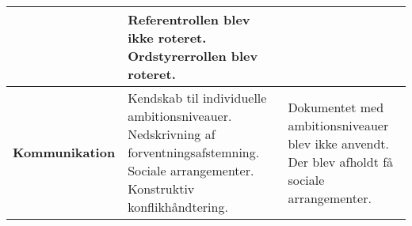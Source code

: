 \begin{table}[h]
\begin{tabular}{|p{3.5cm}|p{5cm}|p{5cm}|}
		                                                           &   Referentrollen blev ikke roteret.                                                               \newline
		                                                           	   Ordstyrerrollen blev roteret.                                       \\ \hline
		\textbf{Kommunikation}                        &   
		       Kendskab til individuelle ambitionsniveauer.     \newline
		 	   Nedskrivning af forventningsafstemning.                                                              \newline
		 	   Sociale arrangementer.                                                   \newline
		 	   Konstruktiv konflikhåndtering.                                                  \newline
		 	                                                       &   Dokumentet med ambitionsniveauer blev ikke anvendt. \newline
		                                                       	       Der blev afholdt få sociale arrangementer.                                                       \newline
		                                                       	                                                      \\ \hline
	\end{tabular}
\end{table}